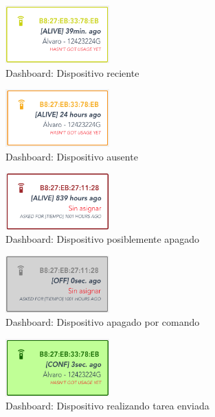 \begin{enumerate}
    \begin{figure}[H]
        \centering
        \includegraphics[width=4cm]{./img/web/devices/dev.greellow.png}
        \caption{Dashboard: Dispositivo reciente}
        \label{fig:web.dir}
    \end{figure}
    
    \begin{figure}[H]
        \centering
        \includegraphics[width=4cm]{./img/web/devices/dev.orange.png}
        \caption{Dashboard: Dispositivo ausente}
        \label{fig:web.dir}
    \end{figure}
    
    \begin{figure}[H]
        \centering
        \includegraphics[width=4cm]{./img/web/devices/dev.red.png}
        \caption{Dashboard: Dispositivo posiblemente apagado}
        \label{fig:web.dir}
    \end{figure}
    
    \begin{figure}[H]
        \centering
        \includegraphics[width=4cm]{./img/web/devices/dev.grey.png}
        \caption{Dashboard: Dispositivo apagado por comando}
        \label{fig:web.dir}
    \end{figure}
    
    \begin{figure}[H]   
        \centering
        \includegraphics[width=4cm]{./img/web/devices/dev.doing.png}
        \caption{Dashboard: Dispositivo realizando tarea enviada}
        \label{fig:web.dir}
    \end{figure}
    

\end{enumerate}
